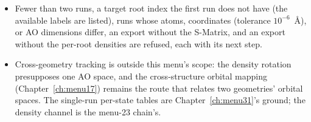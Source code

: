 \begin{refusalbox}
\begin{itemize}
  \item Fewer than two runs, a target root index the first run does not
    have (the available labels are listed), runs whose atoms,
    coordinates (tolerance $10^{-6}$~\AA), or AO dimensions differ, an
    export without the S-Matrix, and an export without the per-root
     densities are refused, each with its next step.
  \item Cross-geometry tracking is outside this menu's scope: the
    density rotation presupposes one AO space, and the cross-structure
    orbital mapping (Chapter~\ref{ch:menu17}) remains the route that
    relates two geometries' orbital spaces.  The single-run per-state
    tables are Chapter~\ref{ch:menu31}'s ground; the density channel is
    the menu-23 chain's.
\end{itemize}
\end{refusalbox}
